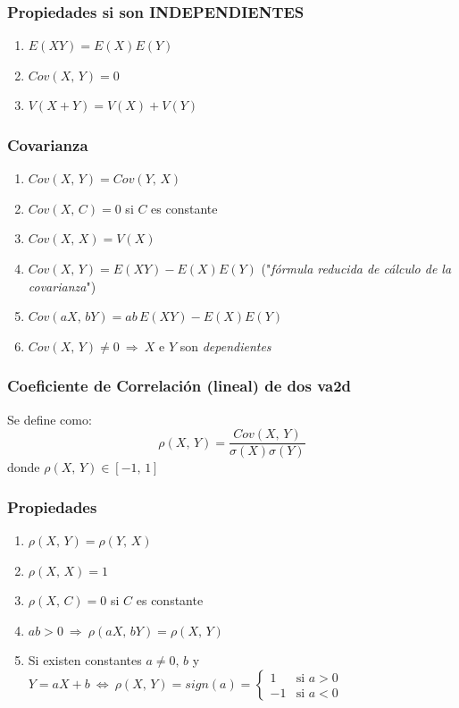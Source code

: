 \documentclass{article}
\newcommand{\comma}{,\,}                                %
\newcommand{\Rightarrows}{\: \Rightarrow \:}            %
\newcommand{\Leftrightarrows}{\: \Leftrightarrow \:}    %
\begin{document}
\subsubsection*{Propiedades si son INDEPENDIENTES}
\begin{enumerate}
    \item $E(XY) = E(X) E(Y)$
    \item $Cov(X \comma Y) = 0$
    \item $V(X + Y) = V(X) + V(Y)$
\end{enumerate}

\subsubsection{Covarianza}
\begin{enumerate}
    \item $Cov(X \comma Y) = Cov(Y \comma X)$
    \item $Cov(X \comma C) = 0$ si $C$ es constante
    \item $Cov(X \comma X) = V(X)$
    \item $Cov(X \comma Y) = E(XY) - E(X) E(Y)$ ("\emph{fórmula reducida de cálculo de la covarianza}")
    \item $Cov(aX \comma bY) = ab \, E(XY) - E(X) E(Y)$
    \item $Cov(X \comma Y) \neq 0 \Rightarrows X$ e $Y$ son \emph{dependientes}
\end{enumerate}

\subsubsection{Coeficiente de Correlación (lineal) de dos va2d}
Se define como:
\begin{equation*}
     \rho(X \comma Y) = \frac{Cov(X \comma Y)}{\sigma(X) \sigma(Y)}
\end{equation*}
donde $\rho(X \comma Y) \in [-1 \comma 1]$
\subsubsection*{Propiedades}
\begin{enumerate}
    \item $\rho(X \comma Y) = \rho(Y \comma X)$
    \item $\rho(X \comma X) = 1$
    \item $\rho(X \comma C) = 0$ si $C$ es constante
    \item $ab > 0 \Rightarrows \rho(aX \comma bY) = \rho(X \comma Y)$
    \item Si existen constantes $a \neq 0 \comma b$ y $Y = aX + b \Leftrightarrows \rho(X \comma Y) = sign(a) = \left\{ \begin{array}{lcc}
         1& \text{si } a > 0 \\
         -1& \text{si } a < 0
    \end{array}
    \right.$ 
\end{enumerate}
\end{document}
